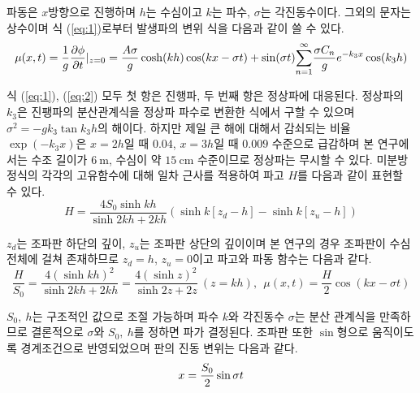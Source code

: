 
파동은 $x$방향으로 진행하며 $h$는 수심이고 $k$는 파수, $\sigma$는 각진동수이다. 그외의 문자는 상수이며 식 (\ref{eq:1})로부터 발생파의 변위 식을 다음과 같이 쓸 수 있다.
\begin{equation} \label{eq:2}
{
\mu(x, t) = {{1 \over g}{{\partial \phi} \over {\partial t}}|_{z=0} } = \frac{A \sigma}{g} \cosh(kh) \cos(kx-\sigma t) +
\sin(\sigma t) {\sum_{n=1}^{\infty}} \frac{\sigma C_n}{g} e^{-k_3 x} \cos(k_3 h)
}
\end{equation}


식 (\ref{eq:1}), (\ref{eq:2}) 모두 첫 항은 진행파, 두 번째 항은 정상파에 대응된다. 정상파의 $k_3$은 진팽파의 분산관계식을 정상파 파수로 변환한 식에서 구할 수 있으며 $\sigma ^2 = -g k_3 \tan{k_3 h}$의 해이다. 하지만 제일 큰 해에 대해서 감쇠되는 비율 $\exp{(-k_{3}x)}$은 $x=2h$일 때 $0.04$, $x=3h$일 때 $0.009$ 수준으로 급감하며 본 연구에서는 수조 길이가 $6~\mathrm{m}$, 수심이 약 $15~\mathrm{cm}$ 수준이므로 정상파는 무시할 수 있다. 미분방정식의 각각의 고유함수에 대해 일차 근사를 적용하여 파고 $H$를 다음과 같이 표현할 수 있다.
\begin{equation} \label{eq:4}
H = \frac{4 S_0 \sinh{kh}}{\sinh{2kh}+2kh} \left(\sinh{k[z_d - h]} - \sinh{k[z_u - h]}\right)
\end{equation}


$z_d$는 조파판 하단의 깊이, $z_u$는 조파판 상단의 깊이이며 본 연구의 경우 조파판이 수심 전체에 걸쳐 존재하므로 $z_d = h$, $z_u = 0$이고 파고와 파동 함수는 다음과 같다.
\begin{equation} \label{eq:5}
{
    \frac{H}{S_0}=\frac{4 (\sinh{kh})^{2}}{\sinh{2kh} + 2kh}
     = \frac{4 (\sinh{z})^{2}}{\sinh{2z} + 2z} ~(z=kh),~~
    \mu(x, t)=\frac{H}{2} \cos (kx -\sigma t)
}
\end{equation}


$S_0 ,~h$는 구조적인 값으로 조절 가능하며 파수 $k$와 각진동수 $\sigma$는 분산 관계식을 만족하므로 결론적으로 $\sigma$와 $S_0 , ~h$를 정하면 파가 결정된다. 조파판 또한 $\sin$형으로 움직이도록 경계조건으로 반영되었으며 판의 진동 변위는 다음과 같다.
\begin{equation} \label{eq:7}
{
    x = {{S_0}\over2} \sin{\sigma t}
}
\end{equation}

